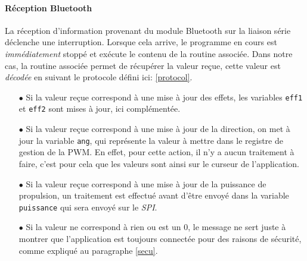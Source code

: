 			\paragraph{Réception Bluetooth} La réception d'information provenant du module Bluetooth sur la liaison série déclenche une interruption. Lorsque cela arrive, le programme en cours est \textit{immédiatement} stoppé et exécute le contenu de la routine associée. Dans notre cas, la routine associée permet de récupérer la valeur reçue, cette valeur est \textit{décodée} en suivant le protocole défini ici: \ref{protocol}.
			\begin{itemize}
			\item[$\bullet$] Si la valeur reçue correspond à une mise à jour des effets, les variables \texttt{eff1} et \texttt{eff2} sont mises à jour, ici complémentée. 
			\item[$\bullet$] Si la valeur reçue correspond à une mise à jour de la direction, on met à jour la variable \texttt{ang}, qui représente la valeur à mettre dans le registre de gestion de la PWM. En effet, pour cette action, il n'y a aucun traitement à faire, c'est pour cela que les valeurs sont ainsi sur le curseur de l'application.
			\item[$\bullet$] Si la valeur reçue correspond à une mise à jour de la puissance de propulsion, un traitement est effectué avant d'être envoyé dans la variable \texttt{puissance} qui sera envoyé sur le \textit{SPI}.
			\item[$\bullet$] Si la valeur ne correspond à rien ou est un 0, le message ne sert juste à montrer que l'application est toujours connectée pour des raisons de sécurité, comme expliqué au paragraphe \ref{secu}.		
			\end{itemize}			 
